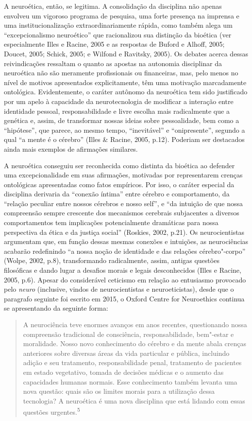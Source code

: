 A neuroética, então, se legitima. A consolidação da disciplina não
apenas envolveu um vigoroso programa de pesquisa, uma forte presença na
imprensa e uma institucionalização extraordinariamente rápida, como
também alega um ``excepcionalismo neuroético'' que racionalizou sua
distinção da bioética (ver especialmente Illes e Racine, 2005 e as
respostas de Buford e Alhoff, 2005; Doucet, 2005; Schick, 2005; e
Wilfond e Ravitsky, 2005). Os debates acerca dessas reivindicações
ressaltam o quanto as apostas na autonomia disciplinar da neuroética não
são meramente profissionais ou financeiras, mas, pelo menos no nível de
motivos apresentados explicitamente, têm uma motivação marcadamente
ontológica. Evidentemente, o caráter autônomo da neuroética tem sido
justificado por um apelo à capacidade da neurotecnologia de modificar a
interação entre identidade pessoal, responsabilidade e livre escolha
mais radicalmente que a genética e, assim, de transformar nossas ideias
sobre pessoalidade, bem como a ``hipótese'', que parece, ao mesmo tempo,
``inevitável'' e ``onipresente'', segundo a qual ``a mente é o cérebro''
(Illes \& Racine, 2005, p.12). Poderiam ser destacados ainda mais
exemplos de afirmações similares.

A neuroética conseguiu ser reconhecida como distinta da bioética ao
defender uma excepcionalidade em suas afirmações, motivadas por
representarem crenças ontológicas apresentadas como fatos empíricos. Por
isso, o caráter especial da disciplina derivaria da ``conexão íntima''
entre cérebro e comportamento, da ``relação peculiar entre nossos
cérebros e nosso self'', e ``da intuição de que nossa compreensão sempre
crescente dos mecanismos cerebrais subjacentes a diversos comportamentos
tem implicações potencialmente dramáticas para nossa perspectiva da
ética e da justiça social'' (Roskies, 2002, p.21). Os neurocientistas
argumentam que, em função dessas mesmas conexões e intuições, as
neurociências acabarão redefinindo ``a nossa noção de identidade e das
relações cérebro"-corpo'' (Wolpe, 2002, p.8), transformando radicalmente,
assim, antigas questões filosóficas e dando lugar a desafios morais e
legais desconhecidos (Illes e Racine, 2005, p.6). Apesar do considerável
ceticismo em relação ao entusiasmo provocado pelo \emph{neuro}
(inclusive, vindos de neurocientistas e neuroeticistas), desde que o
paragrafo seguinte foi escrito em 2015, o Oxford Centre for Neuroethics
continua se apresentando da seguinte forma:

\begin{quote}
A neurociência teve enormes avanços em anos recentes, questionando nossa
compreensão tradicional de consciência, responsabilidade, bem"-estar e
moralidade. Nosso novo conhecimento do cérebro e da mente abala crenças
anteriores sobre diversas áreas da vida particular e pública, incluindo
adição e seu tratamento, responsabilidade penal, tratamento de pacientes
em estado vegetativo, tomada de decisões médicas e o aumento das
capacidades humanas normais. Esse conhecimento também levanta uma nova
questão: quais são os limites morais para a utilização dessa tecnologia?
A neuroética é uma nova disciplina que está lidando com essas questões
urgentes.\textsuperscript{5}
\end{quote}

